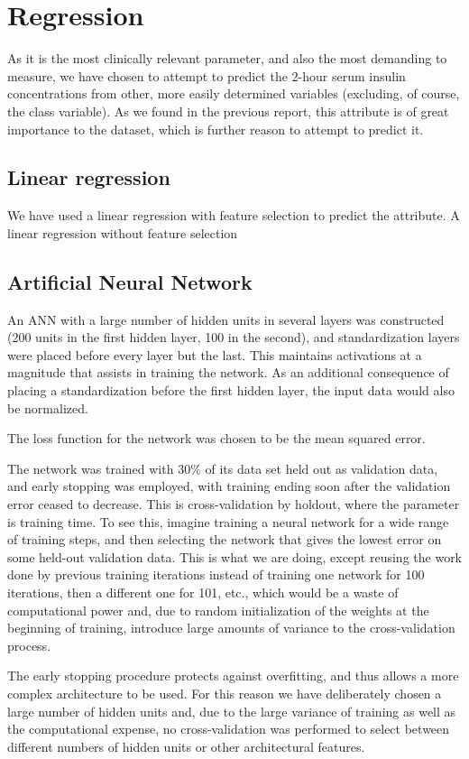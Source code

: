 \section{Regression}
As it is the most clinically relevant parameter,
and also the most demanding to measure,
we have chosen to attempt to predict the 2-hour serum insulin concentrations
from other, more easily determined variables
(excluding, of course, the class variable).
As we found in the previous report,
this attribute is of great importance to the dataset,
which is further reason to attempt to predict it.

\subsection{Linear regression}
We have used a linear regression with feature selection to predict the attribute.
A linear regression without feature selection 

\subsection{Artificial Neural Network}
An ANN with a large number of hidden units in several layers was constructed
(200 units in the first hidden layer, 100 in the second),
and standardization layers were placed before every layer but the last.
This maintains activations at a magnitude that assists in training the network.
As an additional consequence of placing a standardization before the first hidden layer,
the input data would also be normalized.

The loss function for the network was chosen to be the mean squared error.

The network was trained with 30\% of its data set held out as validation data,
and early stopping was employed, with training ending soon after the validation error
ceased to decrease.
This is cross-validation by holdout,
where the parameter is training time.
To see this,
imagine training a neural network for a wide range of training steps,
and then selecting the network that gives the lowest error
on some held-out validation data.
This is what we are doing,
except reusing the work done by previous training iterations
instead of training one network for 100 iterations,
then a different one for 101, etc.,
which would be a waste of computational power
and, due to random initialization of the weights at the beginning of training,
introduce large amounts of variance to the cross-validation process.

The early stopping procedure protects against overfitting,
and thus allows a more complex architecture to be used.
For this reason we have deliberately chosen a large number of hidden units
and, due to the large variance of training as well as the computational expense,
no cross-validation was performed to select between different numbers of hidden units
or other architectural features.

